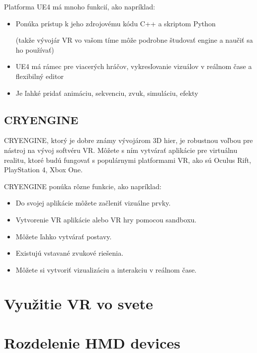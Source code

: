 \documentclass[10pt,twoside,slovak,a4paper]{article}
\begin{document}
Platforma UE4 má mnoho funkcií, ako napríklad:
\begin {itemize}
\item Ponúka prístup k jeho zdrojovému kódu C++ a skriptom Python

(takže vývojár VR vo vašom tíme môže podrobne študovať engine a naučiť sa ho používať)
\item UE4 má rámec pre viacerých hráčov, vykresľovanie vizuálov v reálnom čase a flexibilný editor
\item Je ľahké pridať animáciu, sekvenciu, zvuk, simuláciu, efekty
\end {itemize}
\cite{devteam_2021}


\subsection {CRYENGINE}
CRYENGINE, ktorý je dobre známy vývojárom 3D hier, je robustnou voľbou pre nástroj na vývoj softvéru VR. 
Môžete s ním vytvárať aplikácie pre virtuálnu realitu, ktoré budú fungovať s populárnymi platformami VR, ako sú Oculus Rift, PlayStation 4, Xbox One.

CRYENGINE ponúka rôzne funkcie, ako napríklad:

\begin {itemize}
\item Do svojej aplikácie môžete začleniť vizuálne prvky.
\item Vytvorenie VR aplikácie alebo VR hry pomocou sandboxu.
\item Môžete ľahko vytvárať postavy.
\item Existujú vstavané zvukové riešenia.
\item Môžete si vytvoriť vizualizáciu a interakciu v reálnom čase.
\end {itemize}
\cite{devteam_2021}



\section{Využitie VR vo svete} 

\section{Rozdelenie HMD devices}  
\end{document}
